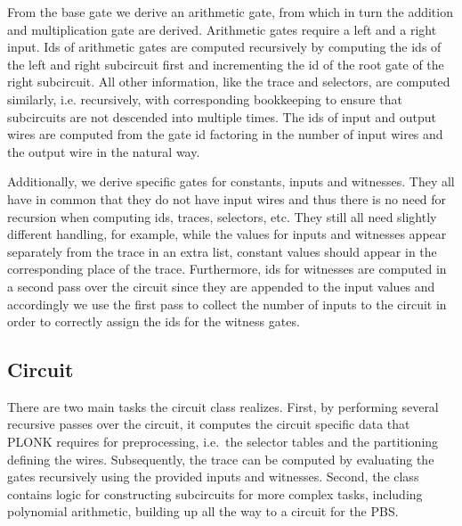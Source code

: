 \documentclass[final]{zamarep}
\begin{document}
From the base gate we derive an arithmetic gate, from which in turn the addition and multiplication gate are derived. Arithmetic gates require a left and a right input. Ids of arithmetic gates are computed recursively by computing the ids of the left and right subcircuit first and incrementing the id of the root gate of the right subcircuit. All other information, like the trace and selectors, are computed similarly, i.e. recursively, with corresponding bookkeeping to ensure that subcircuits are not descended into multiple times. The ids of input and output wires are computed from the gate id factoring in the number of input wires and the output wire in the natural way.

Additionally, we derive specific gates for constants, inputs and witnesses. They all have in common that they do not have input wires and thus there is no need for recursion when computing ids, traces, selectors, etc. They still all need slightly different handling, for example, while the values for inputs and witnesses appear separately from the trace in an extra list, constant values should appear in the corresponding place of the trace. Furthermore, ids for witnesses are computed in a second pass over the circuit since they are appended to the input values and accordingly we use the first pass to collect the number of inputs to the circuit in order to correctly assign the ids for the witness gates.

\subsection{Circuit}
\label{sec:circuit}

There are two main tasks the circuit class realizes. First, by performing several recursive passes over the circuit, it computes the circuit specific data that PLONK requires for preprocessing, i.e.\ the selector tables and the partitioning defining the wires. Subsequently, the trace can be computed by evaluating the gates recursively using the provided inputs and witnesses. Second, the class contains logic for constructing subcircuits for more complex tasks, including polynomial arithmetic, building up all the way to a circuit for the PBS. 
\end{document}
